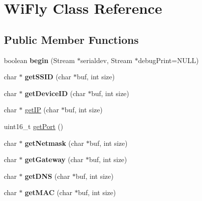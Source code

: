 \hypertarget{class_wi_fly}{
\section{\-Wi\-Fly \-Class \-Reference}
\label{class_wi_fly}
}
\subsection*{\-Public \-Member \-Functions}
\begin{DoxyCompactItemize}
\item 
\hypertarget{class_wi_fly_a85fbb2d5f8be33744e3ea68122ac7dac}{
boolean {\bfseries begin} (\-Stream $\ast$serialdev, \-Stream $\ast$debug\-Print=\-N\-U\-L\-L)}
\label{class_wi_fly_a85fbb2d5f8be33744e3ea68122ac7dac}

\item 
\hypertarget{class_wi_fly_af23b59ec55f076da89d7a8a627c97454}{
char $\ast$ {\bfseries get\-S\-S\-I\-D} (char $\ast$buf, int size)}
\label{class_wi_fly_af23b59ec55f076da89d7a8a627c97454}

\item 
\hypertarget{class_wi_fly_aebbda57bcc32cf90c9d4d56b042043dd}{
char $\ast$ {\bfseries get\-Device\-I\-D} (char $\ast$buf, int size)}
\label{class_wi_fly_aebbda57bcc32cf90c9d4d56b042043dd}

\item 
char $\ast$ \hyperlink{class_wi_fly_a0071323aefaaf3b77ee6972cb166a118}{get\-I\-P} (char $\ast$buf, int size)
\item 
uint16\-\_\-t \hyperlink{class_wi_fly_abb057301f5856eb70ea4a5acbf04fc5a}{get\-Port} ()
\item 
\hypertarget{class_wi_fly_a4eceaf17762373addceaaf8e21956deb}{
char $\ast$ {\bfseries get\-Netmask} (char $\ast$buf, int size)}
\label{class_wi_fly_a4eceaf17762373addceaaf8e21956deb}

\item 
\hypertarget{class_wi_fly_a417efac59ae132a0257a04bccac75b4b}{
char $\ast$ {\bfseries get\-Gateway} (char $\ast$buf, int size)}
\label{class_wi_fly_a417efac59ae132a0257a04bccac75b4b}

\item 
\hypertarget{class_wi_fly_aa99844e06ee006d15d107d1bc9bd9b18}{
char $\ast$ {\bfseries get\-D\-N\-S} (char $\ast$buf, int size)}
\label{class_wi_fly_aa99844e06ee006d15d107d1bc9bd9b18}

\item 
\hypertarget{class_wi_fly_a3e08681bbfa7044882a7376c9170ed34}{
char $\ast$ {\bfseries get\-M\-A\-C} (char $\ast$buf, int size)}
\label{class_wi_fly_a3e08681bbfa7044882a7376c9170ed34}


\end{DoxyCompactItemize}
